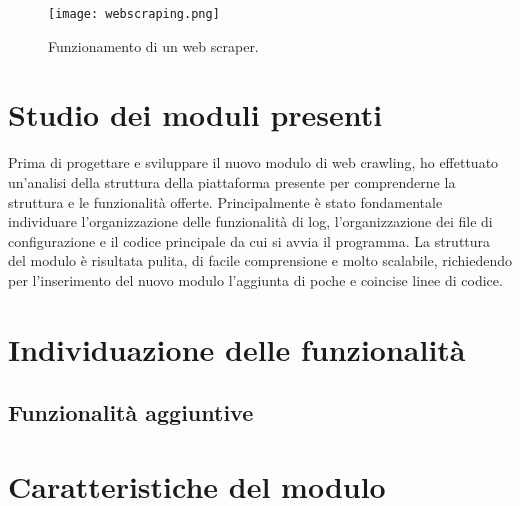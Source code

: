 \begin{figure}[!h] 
    \centering 
    \texttt{[image: webscraping.png]} 
    \caption{Funzionamento di un web scraper.}
\end{figure}


\section{Studio dei moduli presenti}

Prima di progettare e sviluppare il nuovo modulo di web crawling, ho effettuato un’analisi della struttura della piattaforma presente per comprenderne la struttura e le funzionalità offerte. Principalmente è stato fondamentale individuare l'organizzazione delle funzionalità di log, l'organizzazione dei file di configurazione e il codice principale da cui si avvia il programma. La struttura del modulo è risultata pulita, di facile comprensione e molto scalabile, richiedendo per l'inserimento del nuovo modulo l'aggiunta di poche e coincise linee di codice.


\section{Individuazione delle funzionalità}



\subsection{Funzionalità aggiuntive}

\section{Caratteristiche del modulo}
